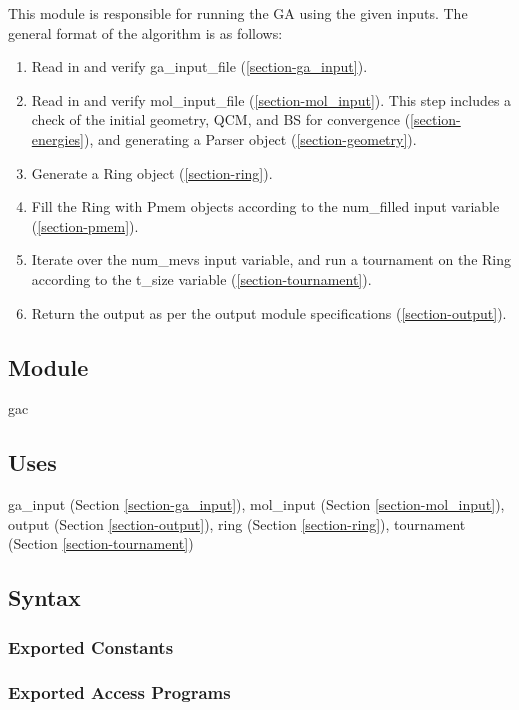 \documentclass[12pt, titlepage]{article}
\begin{document}
This module is responsible for running the GA using the given inputs. The 
general format of the algorithm is as follows:
\begin{enumerate}
	\item Read in and verify ga\_input\_file (\ref{section-ga_input}).
	\item Read in and verify mol\_input\_file (\ref{section-mol_input}). This 
	step includes a check of the initial geometry, QCM, and BS for convergence 
	(\ref{section-energies}), and generating a Parser object 
	(\ref{section-geometry}).
	\item Generate a Ring object (\ref{section-ring}).
	\item Fill the Ring with Pmem objects according to the num\_filled input 
	variable (\ref{section-pmem}).
	\item Iterate over the num\_mevs input variable, and run a tournament on 
	the Ring according to the t\_size variable (\ref{section-tournament}).
	\item Return the output as per the output module specifications 
	(\ref{section-output}).
\end{enumerate}

\subsection{Module}

gac

\subsection{Uses}

ga\_input (Section \ref{section-ga_input}), 
mol\_input (Section \ref{section-mol_input}),
output (Section \ref{section-output}),
ring (Section \ref{section-ring}),
tournament (Section \ref{section-tournament})

\subsection{Syntax}

\subsubsection{Exported Constants}

\subsubsection{Exported Access Programs}
\end{document}
